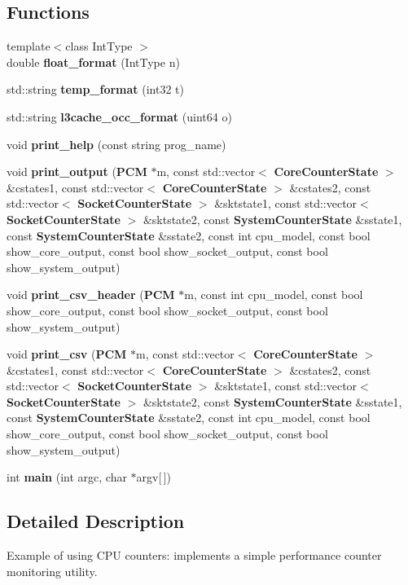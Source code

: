\subsection*{Functions}
\begin{DoxyCompactItemize}
\item 
{\footnotesize template$<$class Int\+Type $>$ }\\double {\bfseries float\+\_\+format} (Int\+Type n)\label{pcm_8cpp_afb78946f84b894fb4284e7b672cda23c}

\item 
std\+::string {\bfseries temp\+\_\+format} (int32 t)\label{pcm_8cpp_aeebeb8e745c5a040d4be7740061e1f76}

\item 
std\+::string {\bfseries l3cache\+\_\+occ\+\_\+format} (uint64 o)\label{pcm_8cpp_a72b1e8c5ff6ef33763687c1b3d0d5409}

\item 
void {\bfseries print\+\_\+help} (const string prog\+\_\+name)\label{pcm_8cpp_aed15bac2c898efcc1f005764539f7970}

\item 
void {\bfseries print\+\_\+output} ({\bf P\+C\+M} $\ast$m, const std\+::vector$<$ {\bf Core\+Counter\+State} $>$ \&cstates1, const std\+::vector$<$ {\bf Core\+Counter\+State} $>$ \&cstates2, const std\+::vector$<$ {\bf Socket\+Counter\+State} $>$ \&sktstate1, const std\+::vector$<$ {\bf Socket\+Counter\+State} $>$ \&sktstate2, const {\bf System\+Counter\+State} \&sstate1, const {\bf System\+Counter\+State} \&sstate2, const int cpu\+\_\+model, const bool show\+\_\+core\+\_\+output, const bool show\+\_\+socket\+\_\+output, const bool show\+\_\+system\+\_\+output)\label{pcm_8cpp_a28cc5dffe9221f0632118d273a0a343e}

\item 
void {\bfseries print\+\_\+csv\+\_\+header} ({\bf P\+C\+M} $\ast$m, const int cpu\+\_\+model, const bool show\+\_\+core\+\_\+output, const bool show\+\_\+socket\+\_\+output, const bool show\+\_\+system\+\_\+output)\label{pcm_8cpp_a5c5784799bcae99ab7d4a4c26ce9208d}

\item 
void {\bfseries print\+\_\+csv} ({\bf P\+C\+M} $\ast$m, const std\+::vector$<$ {\bf Core\+Counter\+State} $>$ \&cstates1, const std\+::vector$<$ {\bf Core\+Counter\+State} $>$ \&cstates2, const std\+::vector$<$ {\bf Socket\+Counter\+State} $>$ \&sktstate1, const std\+::vector$<$ {\bf Socket\+Counter\+State} $>$ \&sktstate2, const {\bf System\+Counter\+State} \&sstate1, const {\bf System\+Counter\+State} \&sstate2, const int cpu\+\_\+model, const bool show\+\_\+core\+\_\+output, const bool show\+\_\+socket\+\_\+output, const bool show\+\_\+system\+\_\+output)\label{pcm_8cpp_a07b91ae909486337f4250d820ead84f5}

\item 
int {\bfseries main} (int argc, char $\ast$argv[$\,$])\label{pcm_8cpp_a0ddf1224851353fc92bfbff6f499fa97}

\end{DoxyCompactItemize}


\subsection{Detailed Description}
Example of using C\+P\+U counters\+: implements a simple performance counter monitoring utility. 

